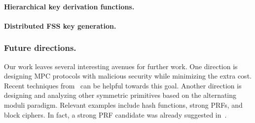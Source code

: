 \paragraph{Hierarchical key derivation functions.} 




\paragraph{Distributed FSS key generation.} 

\subsubsection{Future directions.} Our work leaves several interesting avenues for further work. One direction is designing MPC protocols with malicious security while minimizing the extra cost. Recent techniques from~\cite{cite} can be helpful towards this goal. Another direction is designing and analyzing other symmetric primitives based on the alternating moduli paradigm. Relevant examples include hash functions, strong PRFs, and block ciphers.  In fact, a strong PRF candidate was already suggested in~\cite{boneh2018-darkmatter}. 


